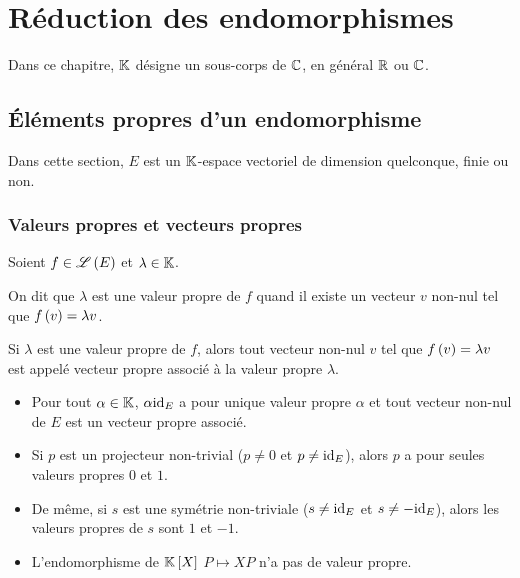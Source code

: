 \chapter{Réduction des endomorphismes}

\minitoc

Dans ce chapitre, \(\mathbb{K}\) désigne un sous-corps de \(\mathbb{C}\), en général \(\mathbb{R}\) ou \(\mathbb{C}\).

\section{Éléments propres d'un endomorphisme}

Dans cette section, \(E\) est un \(\mathbb{K}\)-espace vectoriel de dimension quelconque, finie ou non.

\subsection{Valeurs propres et vecteurs propres}

\begin{defi}
Soient \(f\in\mathscr{L}\left(E\right)\) et \(\lambda\in\mathbb{K}\).

On dit que \(\lambda\) est une valeur propre de \(f\) quand il existe un vecteur \(v\) non-nul tel que \(f\left(v\right)=\lambda v\).

Si \(\lambda\) est une valeur propre de \(f\), alors tout vecteur non-nul \(v\) tel que \(f\left(v\right)=\lambda v\) est appelé vecteur propre associé à la valeur propre \(\lambda\).
\end{defi}

\begin{ex}
\begin{itemize}
    \item Pour tout \(\alpha\in\mathbb{K}\), \(\alpha\mathrm{id}_{E}\) a pour unique valeur propre \(\alpha\) et tout vecteur non-nul de \(E\) est un vecteur propre associé. \\
    \item Si \(p\) est un projecteur non-trivial (\ie \(p\not=0\) et \(p\not=\mathrm{id}_{E}\)), alors \(p\) a pour seules valeurs propres \(0\) et \(1\). \\
    \item De même, si \(s\) est une symétrie non-triviale (\ie \(s\not=\mathrm{id}_{E}\) et \(s\not=-\mathrm{id}_{E}\)), alors les valeurs propres de \(s\) sont \(1\) et \(-1\). \\
    \item L'endomorphisme de \(\poly\) \(P\mapsto XP\) n'a pas de valeur propre.
\end{itemize}
\end{ex}

